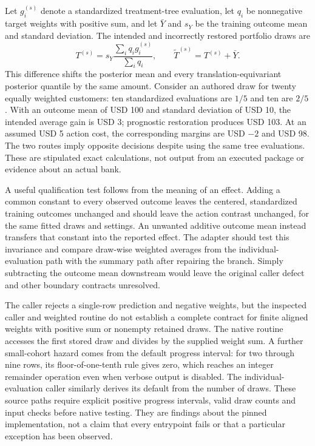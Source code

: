 Let $g_i^{(s)}$ denote a standardized treatment-tree evaluation, let $q_i$ be nonnegative target weights with positive sum, and let $\bar Y$ and $s_Y$ be the training outcome mean and standard deviation. The intended and incorrectly restored portfolio draws are
\begin{equation}
 T^{(s)}=s_Y\frac{\sum_i q_i g_i^{(s)}}{\sum_i q_i},
 \qquad \widetilde T^{(s)}=T^{(s)}+\bar Y.
 \label{rel16:flex-scale}
\end{equation}
This difference shifts the posterior mean and every translation-equivariant posterior quantile by the same amount. Consider an authored draw for twenty equally weighted customers: ten standardized evaluations are $1/5$ and ten are $2/5$. With an outcome mean of USD 100 and standard deviation of USD 10, the intended average gain is USD 3; prognostic restoration produces USD 103. At an assumed USD 5 action cost, the corresponding margins are USD $-2$ and USD 98. The two routes imply opposite decisions despite using the same tree evaluations. These are stipulated exact calculations, not output from an executed package or evidence about an actual bank.~\citep{rel16flexcallers,rel16flexwitnesses}

A useful qualification test follows from the meaning of an effect. Adding a common constant to every observed outcome leaves the centered, standardized training outcomes unchanged and should leave the action contrast unchanged, for the same fitted draws and settings. An unwanted additive outcome mean instead transfers that constant into the reported effect. The adapter should test this invariance and compare draw-wise weighted averages from the individual-evaluation path with the summary path after repairing the branch. Simply subtracting the outcome mean downstream would leave the original caller defect and other boundary contracts unresolved.~\citep{rel16flexcallers,rel16flexwitnesses}

The caller rejects a single-row prediction and negative weights, but the inspected caller and weighted routine do not establish a complete contract for finite aligned weights with positive sum or nonempty retained draws. The native routine accesses the first stored draw and divides by the supplied weight sum. A further small-cohort hazard comes from the default progress interval: for two through nine rows, its floor-of-one-tenth rule gives zero, which reaches an integer remainder operation even when verbose output is disabled. The individual-evaluation caller similarly derives its default from the number of draws. These source paths require explicit positive progress intervals, valid draw counts and input checks before native testing. They are findings about the pinned implementation, not a claim that every entrypoint fails or that a particular exception has been observed.~\citep{rel16flexcallers,rel16flexwitnesses}

